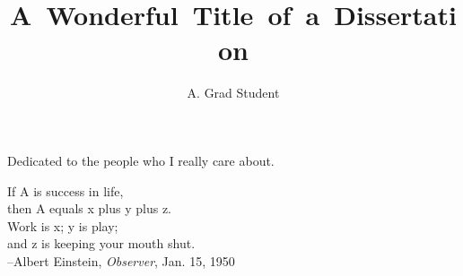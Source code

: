 \documentclass[12pt]{report}	%
\author{A. Grad Student}
\title{A~Wonderful~Title~of~a~Dissertation}
\begin{document}
\titlepage              %

\copyrightpage          %

\approvalpage           %

%
%
%
\begin{dedication}
Dedicated to the people who I really care about.
\end{dedication}

\begin{epigraph}
If A is success in life,\\
then A equals x plus y plus z.\\
Work is x; y is play;\\
and z is keeping your mouth shut.\\
--Albert Einstein, \emph{Observer}, Jan. 15, 1950
\end{epigraph}
\end{document}
